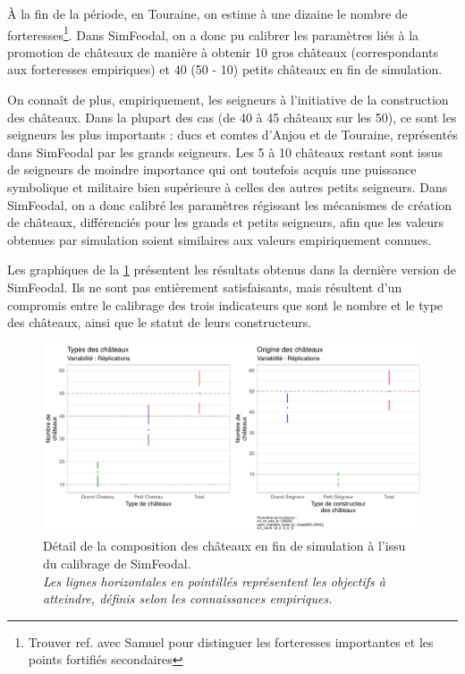 À la fin de la période, en Touraine, on estime à une dizaine le nombre de \og forteresses\fg{}\footnote{
	Trouver ref. avec Samuel pour distinguer les \og forteresses importantes\fg{} et les \og points fortifiés secondaires\fg{}
}.
Dans SimFeodal, on a donc pu calibrer les paramètres liés à la promotion de châteaux de manière à obtenir 10 gros châteaux (correspondants aux forteresses empiriques) et 40 (50 - 10) petits châteaux en fin de simulation.

On connaît de plus, empiriquement, les seigneurs à l'initiative de la construction des châteaux.
Dans la plupart des cas (de 40 à 45 châteaux sur les 50), ce sont les seigneurs les plus importants : ducs et comtes d'Anjou et de Touraine, représentés dans SimFeodal par les grands seigneurs.
Les 5 à 10 châteaux restant sont issus de seigneurs de moindre importance qui ont toutefois acquis une puissance symbolique et militaire bien supérieure à celles des autres petits seigneurs.
Dans SimFeodal, on a donc calibré les paramètres régissant les mécanismes de création de châteaux, différenciés pour les grands et petits seigneurs, afin que les valeurs obtenues par simulation soient similaires aux valeurs empiriquement connues.

Les graphiques de la \cref{fig:calibrage-chateaux-composition} présentent les résultats obtenus dans la dernière version de SimFeodal.
Ils ne sont pas entièrement satisfaisants, mais résultent d'un compromis entre le calibrage des trois indicateurs que sont le nombre et le type des châteaux, ainsi que le statut de leurs constructeurs.

\begin{figure}[H]
	\centering
	\includegraphics[width=\linewidth]{img/Chateaux_Types_condenses.pdf}
	\caption{Détail de la composition des châteaux en fin de simulation à l'issu du calibrage de SimFeodal.\\
	\textit{Les lignes horizontales en pointillés représentent les objectifs à atteindre, définis selon les connaissances empiriques.}}
	\label{fig:calibrage-chateaux-composition}
\end{figure}


